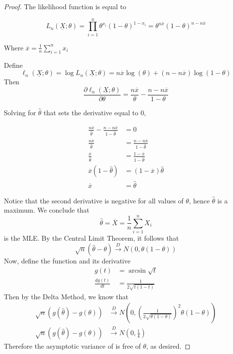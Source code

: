 \documentclass[letterpaper, 12pt]{article}
\begin{document}
\begin{proof}
The likelihood function is equal to

\begin{equation*}
L_{n}(\underline{X}; \theta)
=
\prod\limits_{i=1}^{n}
\theta ^{x_{i}}(1-\theta
)^{1-x_{i}}
=
\theta ^{n\overline{x}}(1-\theta )^{n-n\overline{x}}
\end{equation*}

Where $\overline{x}=\frac{1}{n}\sum\limits_{i=1}^{n}x_{i}$

Define 
\begin{equation*}
\ell_{n}(\underline{X}; \theta)
=\log 
L_{n}(\underline{X}; \theta)
=n\overline{x}\log (\theta )+(n-n\overline{x})\log (1-\theta )
\end{equation*}
Then
\begin{equation*}
\frac{\partial \ell_{n}(\underline{X}; \theta)}{\partial \theta }=\frac{n%
\overline{x}}{\theta }-\frac{n-n\overline{x}}{1-\theta }
\end{equation*}

Solving for $\hat{\theta}$ that sets the derivative equal to 0,

\begin{align*}
\frac{n\overline{x}}{\hat{\theta} }-\frac{n-n\overline{x}}{1-\hat{\theta} } &=0 \\
\frac{n\overline{x}}{\hat{\theta} } &=\frac{n-n\overline{x}}{1-\hat{\theta} } \\
\frac{\overline{x}}{\hat{\theta}} &=\frac{1-\overline{x}}{1-\hat{\theta} } \\
\overline{x}(1-\hat{\theta} ) &=(1-\overline{x})\hat{\theta} \\
\overline{x} &=\hat{\theta}
\end{align*}

Notice that the second derivative is negative for all values of $\theta$, hence $\hat{\theta}$ is a maximum.
We conclude that
\begin{equation*}
\hat{\theta }=\overline{X}=\frac{1}{n}\sum\limits_{i=1}^{n}X_{i}
\end{equation*}
is the MLE. By the Central Limit Theorem, it follows that
\begin{equation*}
\sqrt{n}\left( \hat{\theta }-\theta \right) \overset{D}{\rightarrow }N(0,\theta (1-\theta))
\end{equation*}
Now, define the function and its derivative
\begin{align*}
g(t) &=\arcsin \sqrt{t} \\
\frac{dg(t)}{dt} &=\frac{1}{2\sqrt{t(1-t)}}
\end{align*}
Then by the Delta Method, we know that 
\begin{align*}
\sqrt{n}
\left( 
g(\hat{\theta})-g
\left(\theta \right)
\right) 
&
\overset{D}{\rightarrow }
N
\left(
0,
\left( 
\frac{1}{2\sqrt{\theta (1-\theta )}}
\right)^{2}
\theta
(1-\theta)\right) \\
\sqrt{n}\left(
g(\hat{\theta })-g\left(\theta \right)
\right) 
&\overset{D}{\rightarrow }
N\left(0,\frac{1}{4}\right)
\end{align*}
Therefore the asymptotic variance of is free of $\theta$, as desired.
\end{proof}
\end{document}
